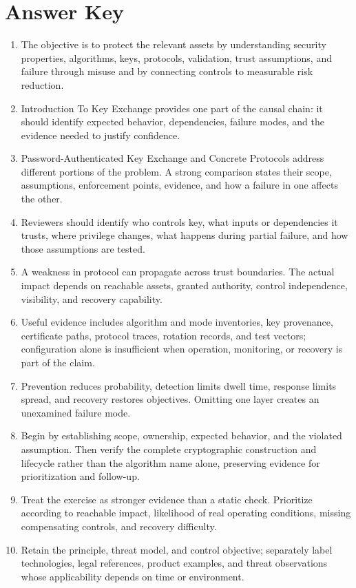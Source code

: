 \documentclass[11pt]{article}
\begin{document}
\section*{Answer Key}
\begin{enumerate}
\item The objective is to protect the relevant assets by understanding security properties, algorithms, keys, protocols, validation, trust assumptions, and failure through misuse and by connecting controls to measurable risk reduction.
\item Introduction To Key Exchange provides one part of the causal chain: it should identify expected behavior, dependencies, failure modes, and the evidence needed to justify confidence.
\item Password-Authenticated Key Exchange and Concrete Protocols address different portions of the problem. A strong comparison states their scope, assumptions, enforcement points, evidence, and how a failure in one affects the other.
\item Reviewers should identify who controls key, what inputs or dependencies it trusts, where privilege changes, what happens during partial failure, and how those assumptions are tested.
\item A weakness in protocol can propagate across trust boundaries. The actual impact depends on reachable assets, granted authority, control independence, visibility, and recovery capability.
\item Useful evidence includes algorithm and mode inventories, key provenance, certificate paths, protocol traces, rotation records, and test vectors; configuration alone is insufficient when operation, monitoring, or recovery is part of the claim.
\item Prevention reduces probability, detection limits dwell time, response limits spread, and recovery restores objectives. Omitting one layer creates an unexamined failure mode.
\item Begin by establishing scope, ownership, expected behavior, and the violated assumption. Then verify the complete cryptographic construction and lifecycle rather than the algorithm name alone, preserving evidence for prioritization and follow-up.
\item Treat the exercise as stronger evidence than a static check. Prioritize according to reachable impact, likelihood of real operating conditions, missing compensating controls, and recovery difficulty.
\item Retain the principle, threat model, and control objective; separately label technologies, legal references, product examples, and threat observations whose applicability depends on time or environment.
\end{enumerate}
\end{document}

